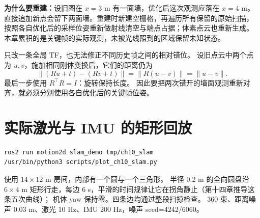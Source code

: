 \textbf{为什么要重建：}设旧图在 $x=3$ m 有一面墙，优化后这次观测应落在 $x=4$ m。
直接追加新点会留下两面墙。重建时新建空栅格，再遍历所有保留的原始扫描，
按照各自优化后的采样位姿重新做射线清空与端点占据；体素点云也重新生成。
本章累积的是关键帧的实际观测，未被光线照到的区域保留未知状态。

只改一条全局 TF，也无法修正不同历史帧之间的相对错位。
设旧点云中两个点为 $u,v$，施加相同刚体变换后，它们的距离仍为
\begin{equation}
\|(Ru+t)-(Rv+t)\|=\|R(u-v)\|=\|u-v\|.
\end{equation}
最后一步使用 $R^\top R=I$：旋转保持长度。
因此要把两次错开的墙面观测重新对齐，就必须分别使用各自优化后的关键帧位姿。

\begin{center}
\end{center}

\clearpage
\section{实际激光与 IMU 的矩形回放}
\begin{lstlisting}[language=bash]
ros2 run motion2d slam_demo tmp/ch10_slam
/usr/bin/python3 scripts/plot_ch10_slam.py
\end{lstlisting}
使用 $14\times12$ m 房间，内部有一个圆与一个三角形。
半径 0.2 m 的全向圆盘沿 $6\times4$ m 矩形行走，每边 6 s，平滑的时间规律让它在拐角静止（第十四章推导这条五次曲线）；
机体 yaw 保持零。四条边均通过整段扫掠检查。
360 束、距离噪声 0.03 m、激光 10 Hz、IMU 200 Hz，噪声 seed=4242/6060。

